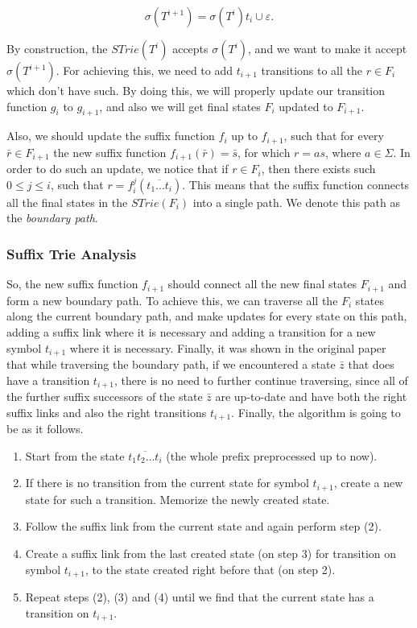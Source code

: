 \documentclass[paper=a4, fontsize=11pt]{scrartcl} %
\numberwithin{equation}{section} %
\numberwithin{figure}{section} %
\numberwithin{table}{section} %
\begin{document}
$$
\sigma(T^{i+1}) = \sigma(T^i)t_i \cup \varepsilon.
$$

\par By construction, the $STrie(T^i)$ accepts $\sigma(T^i)$, and we want to make it accept $\sigma(T^{i+1})$. For achieving this, we need to add $t_{i+1}$ transitions to all the $r \in F_i$ which don't have such. By doing this, we will properly update our transition function $g_i$ to $g_{i+1}$, and also we will get final states $F_i$ updated to $F_{i+1}$.

\par Also, we should update the suffix function $f_i$ up to $f_{i+1}$, such that for every $\bar{r} \in F_{i+1}$ the new suffix function $f_{i+1}(\bar{r}) = \bar{s}$, for which $r = as$, where $a \in \Sigma$. In order to do such an update, we notice that if $r \in F_i$, then there exists such $0 \le j \le i$, such that $r = f_i^j(\overline{t_1...t_i})$. This means that the suffix function connects all the final states in the $STrie(F_i)$ into a single path. We denote this path as the \textit{boundary path}.

\subsubsection{Suffix Trie Analysis}
\par So, the new suffix function $f_{i+1}$ should connect all the new final states $F_{i+1}$ and form a new boundary path. To achieve this, we can traverse all the $F_i$ states along the current boundary path, and make updates for every state on this path, adding a suffix link where it is necessary and adding a transition for a new symbol $t_{i+1}$ where it is necessary. Finally, it was shown in the original paper~\cite{ukkonen1995line} that while traversing the boundary path, if we encountered a state $\bar{z}$ that does have a transition $t_{i+1}$, there is no need to further continue traversing, since all of the further suffix successors of the state $\bar{z}$ are up-to-date and have both the right suffix links and also the right transitions $t_{i+1}$. Finally, the algorithm is going to be as it follows.

\begin{enumerate}
  \item Start from the state $\overline{t_1 t_2 \dots t_i}$ (the whole prefix preprocessed up to now).
  \item If there is no transition from the current state for symbol $t_{i+1}$, create a new state for such a transition. Memorize the newly created state.
  \item Follow the suffix link from the current state and again perform step (2).
  \item Create a suffix link from the last created state (on step 3) for transition on symbol $t_{i+1}$, to the state created right before that (on step 2).
  \item Repeat steps (2), (3) and (4) until we find that the current state has a transition on $t_{i+1}$.
\end{enumerate}
\end{document}
